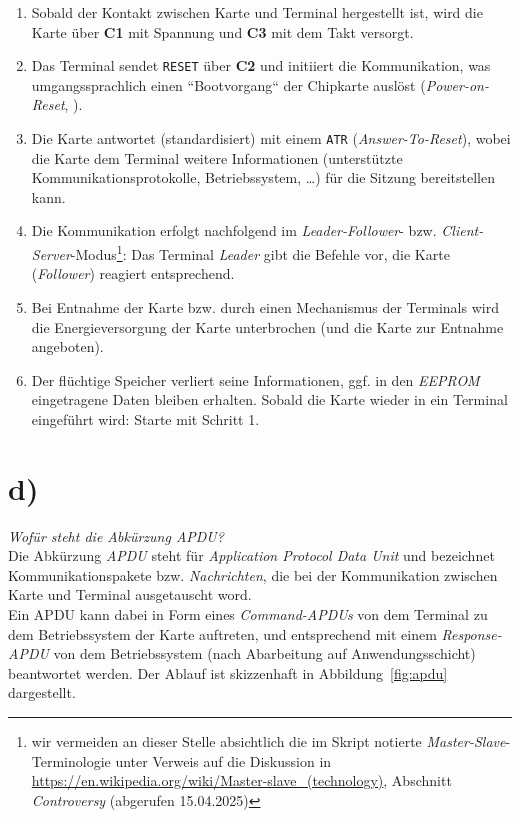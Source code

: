 \noindent
\begin{enumerate}
    \item Sobald der Kontakt zwischen Karte und Terminal hergestellt ist, wird die Karte über \textbf{C1} mit Spannung und \textbf{C3} mit dem Takt versorgt.
    \item Das Terminal sendet \texttt{RESET} über \textbf{C2} und initiiert die Kommunikation, was umgangssprachlich einen ``Bootvorgang`` der Chipkarte auslöst (\textit{Power-on-Reset}, \cite[22]{ITS5}).
    \item Die Karte antwortet (standardisiert) mit einem \texttt{ATR} (\textit{Answer-To-Reset}), wobei die Karte dem Terminal weitere Informationen (unterstützte Kommunikationsprotokolle, Betriebssystem, \ldots) für die Sitzung bereitstellen kann.
    \item Die Kommunikation erfolgt nachfolgend im \textit{Leader-Follower}- bzw. \textit{Client-Server}-Modus\footnote{
    wir vermeiden an dieser Stelle absichtlich die im Skript notierte \textit{Master-Slave}-Terminologie unter Verweis auf die Diskussion in \url{https://en.wikipedia.org/wiki/Master-slave_(technology)}, Abschnitt \textit{Controversy} (abgerufen 15.04.2025)
    }: Das Terminal \textit{Leader} gibt die Befehle vor, die Karte (\textit{Follower}) reagiert entsprechend.
    \item Bei Entnahme der Karte bzw. durch einen Mechanismus der Terminals wird die Energieversorgung der Karte unterbrochen (und die Karte zur Entnahme angeboten).
    \item Der flüchtige Speicher verliert seine Informationen, ggf. in den \textit{EEPROM} eingetragene Daten bleiben erhalten.
    Sobald die Karte wieder in ein Terminal eingeführt wird: Starte mit Schritt 1.
\end{enumerate}


\section{d)}

\textit{Wofür steht die Abkürzung APDU?}\\

\noindent
Die Abkürzung \textit{APDU} steht für \textit{Application Protocol Data Unit} und bezeichnet Kommunikationspakete bzw. \textit{Nachrichten}, die bei der Kommunikation zwischen Karte und Terminal ausgetauscht word.\\
Ein APDU kann dabei in Form eines \textit{Command-APDUs} von dem Terminal zu dem Betriebssystem der Karte auftreten, und entsprechend mit einem \textit{Response-APDU} von dem Betriebssystem (nach Abarbeitung auf Anwendungsschicht) beantwortet werden.
Der Ablauf ist skizzenhaft in Abbildung~\ref{fig:apdu} dargestellt.


